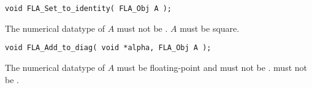 \begin{flaspec}
\begin{verbatim}
void FLA_Set_to_identity( FLA_Obj A );
\end{verbatim}
\begin{checks}
\checkitem
The numerical datatype of $ A $ must not be \flaconstantns.
\itemvsp
\checkitem
$ A $ must be square.
\end{checks}
\begin{params}
\end{params}
\end{flaspec}


\begin{flaspec}
\begin{verbatim}
void FLA_Add_to_diag( void *alpha, FLA_Obj A );
\end{verbatim}
\begin{checks}
\checkitem
The numerical datatype of $ A $ must be floating-point and must not be
\flaconstantns.
\itemvsp
\checkitem
\falpha must not be \fnullns.
\end{checks}
\begin{params}
\end{params}
\end{flaspec}


